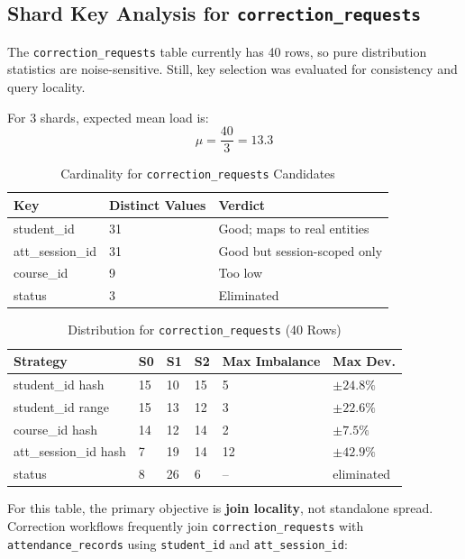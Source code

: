 \documentclass[conference]{IEEEtran}
\begin{document}
\subsection{Shard Key Analysis for \texttt{correction\_requests}}
The \texttt{correction\_requests} table currently has 40 rows, so pure distribution statistics are noise-sensitive. Still, key selection was evaluated for consistency and query locality.

For 3 shards, expected mean load is:
\[
\mu = \frac{40}{3} = 13.3
\]

\begin{table}[htbp]
\caption{Cardinality for \texttt{correction\_requests} Candidates}
\centering
\begin{tabular}{p{2.2cm}p{1.6cm}p{2.4cm}}
\toprule
\textbf{Key} & \textbf{Distinct Values} & \textbf{Verdict} \\
\midrule
student\_id & 31 & Good; maps to real entities \\
att\_session\_id & 31 & Good but session-scoped only \\
course\_id & 9 & Too low \\
status & 3 & Eliminated \\
\bottomrule
\end{tabular}
\label{tab:cr_cardinality}
\end{table}

\begin{table}[htbp]
\caption{Distribution for \texttt{correction\_requests} (40 Rows)}
\centering
\begin{tabular}{p{2.1cm}p{0.8cm}p{0.8cm}p{0.8cm}p{1.2cm}p{1.0cm}}
\toprule
\textbf{Strategy} & \textbf{S0} & \textbf{S1} & \textbf{S2} & \textbf{Max Imbalance} & \textbf{Max Dev.} \\
\midrule
student\_id hash & 15 & 10 & 15 & 5 & $\pm 24.8\%$ \\
student\_id range & 15 & 13 & 12 & 3 & $\pm 22.6\%$ \\
course\_id hash & 14 & 12 & 14 & 2 & $\pm 7.5\%$ \\
att\_session\_id hash & 7 & 19 & 14 & 12 & $\pm 42.9\%$ \\
status & 8 & 26 & 6 & -- & eliminated \\
\bottomrule
\end{tabular}
\label{tab:cr_distribution}
\end{table}

For this table, the primary objective is \textbf{join locality}, not standalone spread. Correction workflows frequently join \texttt{correction\_requests} with \texttt{attendance\_records} using \texttt{student\_id} and \texttt{att\_session\_id}:
\end{document}
